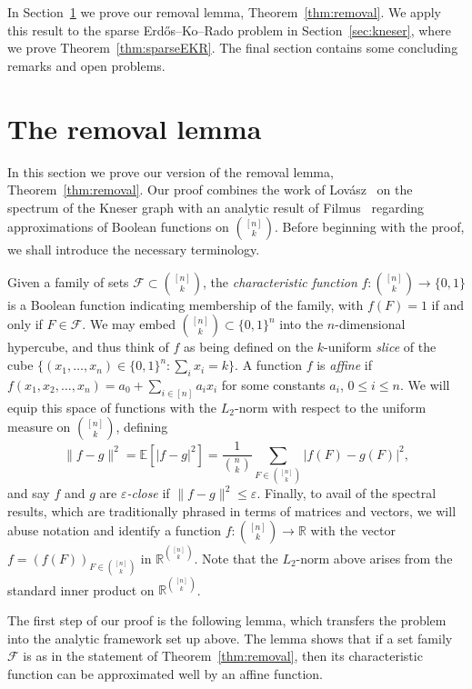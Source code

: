 \documentclass[11pt]{article}
\theoremstyle{definition}
\newcommand{\eps}{\varepsilon}
\newcommand{\cF}{\mathcal{F}}
\newcommand{\3}{\bf{3}}
\newcommand{\card}[1]{\left| #1 \right|}
\newcommand{\Exp}{\mathbb{E}}
\begin{document}
In Section~\ref{sec:removal} we prove our removal lemma, Theorem~\ref{thm:removal}.  We apply this result to the sparse Erd\H{o}s--Ko--Rado problem in Section~\ref{sec:kneser}, where we prove Theorem~\ref{thm:sparseEKR}.  The final section contains some concluding remarks and open problems.

\section{The removal lemma} \label{sec:removal}

In this section we prove our version of the removal lemma, Theorem~\ref{thm:removal}.  Our proof combines the work of Lov\'asz~\cite{lov79} on the spectrum of the Kneser graph with an analytic result of Filmus~\cite{fil14} regarding approximations of Boolean functions on $\binom{[n]}{k}$.  Before beginning with the proof, we shall introduce the necessary terminology.

Given a family of sets $\cF \subset \binom{[n]}{k}$, the \emph{characteristic function} $f: \binom{[n]}{k} \rightarrow \{0,1\}$ is a Boolean function indicating membership of the family, with $f(F) = 1$ if and only if $F \in \cF$.  We may embed $\binom{[n]}{k} \subset \{0,1\}^n$ into the $n$-dimensional hypercube, and thus think of $f$ as being defined on the $k$-uniform \emph{slice} of the cube $\{ (x_1, \hdots, x_n) \in \{0,1\}^n : \sum_i x_i = k \}$.  A function $f$ is \emph{affine} if $f(x_1, x_2, \hdots, x_n) = a_0 + \sum_{i \in [n]} a_i x_i$ for some constants $a_i$, $0 \le i \le n$.  We will equip this space of functions with the $L_2$-norm with respect to the uniform measure on $\binom{[n]}{k}$, defining
\[ \|f - g\|^2 = \Exp \left[ \card{f-g}^2 \right] = \frac{1}{\binom{n}{k}} \sum_{F \in \binom{[n]}{k}} \card{f(F) - g(F)}^2, \]
and say $f$ and $g$ are \emph{$\eps$-close} if $\|f - g\|^2 \le \eps$.  Finally, to avail of the spectral results, which are traditionally phrased in terms of matrices and vectors, we will abuse notation and identify a function $f: \binom{[n]}{k} \rightarrow \mathbb{R}$ with the vector $f = (f(F))_{F \in \binom{[n]}{k}}$ in $\mathbb{R}^{\binom{[n]}{k}}$.  Note that the $L_2$-norm above arises from the standard inner product on $\mathbb{R}^{\binom{[n]}{k}}$.

The first step of our proof is the following lemma, which transfers the problem into the analytic framework set up above.  The lemma shows that if a set family $\cF$ is as in the statement of Theorem~\ref{thm:removal}, then its characteristic function can be approximated well by an affine function.
\end{document}
